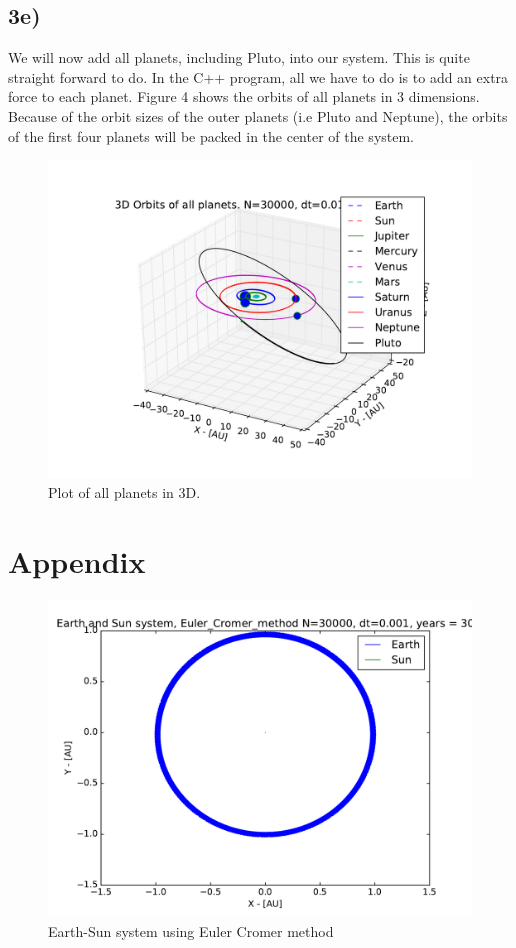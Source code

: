 \documentclass[12pt]{article}
\begin{document}
\subsection*{3e)}
We will now add all planets, including Pluto, into our system. This is quite straight forward to do. In the C++ program, all we have to do is to add an extra force to each planet. Figure 4 shows the orbits of all planets in 3 dimensions. Because of the orbit sizes of the outer planets (i.e Pluto and Neptune), the orbits of the first four planets will be packed in the center of the system.

\begin{figure}[hbtp]
\centering
\includegraphics[width=\linewidth]{Plots/All_planets_3D_plot.pdf}
\caption{Plot of all planets in 3D.}
\end{figure}


\section*{Appendix}
\begin{figure}[hbtp]
\centering
\includegraphics[width=\linewidth]{Plots/Earth_Sun_Euler_Cromer_method.pdf}
\caption{Earth-Sun system using Euler Cromer method}
\end{figure}
\end{document}
